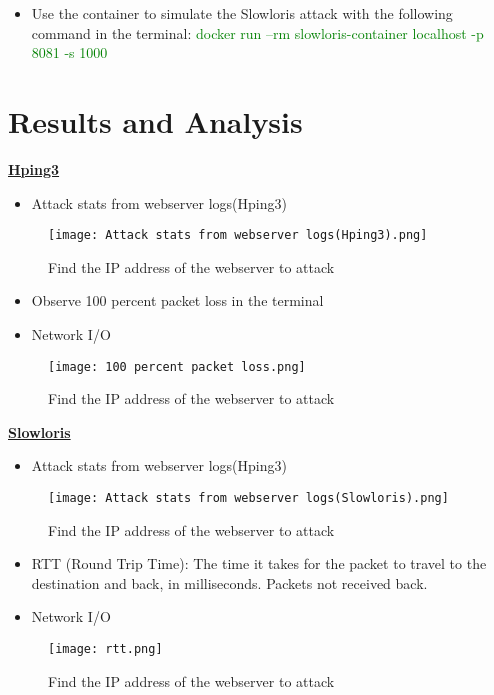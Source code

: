 \documentclass[conference]{IEEEtran}
\begin{document}
\begin{itemize}
\item Use the container to simulate the Slowloris attack with the following command in the terminal: \textcolor{green}{    docker run --rm slowloris-container localhost -p 8081 -s    1000
}
\end{itemize}


\section{Results and Analysis}
\underline{\textbf{Hping3}}
\begin{itemize}
\item Attack stats from webserver logs(Hping3)
\end{itemize}
\begin{figure}[htbp]
\hspace{0.7cm} 
\centerline{\texttt{[image: Attack stats from webserver logs(Hping3).png]}}
\caption{Find the IP address of the webserver to attack}
\label{fig}
\end{figure}
\begin{itemize}
\item Observe 100 percent packet loss in the terminal
\item Network I/O
\end{itemize}
\begin{figure}[htbp]
\hspace{0.7cm} 
\centerline{\texttt{[image: 100 percent packet loss.png]}}
\caption{Find the IP address of the webserver to attack}
\label{fig}
\end{figure}

\underline{\textbf{Slowloris}}
\begin{itemize}
\item Attack stats from webserver logs(Hping3)
\end{itemize}
\begin{figure}[htbp]
\hspace{0.7cm} 
\centerline{\texttt{[image: Attack stats from webserver logs(Slowloris).png]}}
\caption{Find the IP address of the webserver to attack}
\label{fig}
\end{figure}
\begin{itemize}
\item RTT (Round Trip Time): The time it takes for the packet to travel to the destination and back, in milliseconds. Packets not received back.
\item Network I/O
\end{itemize}
\begin{figure}[htbp]
\hspace{0.6cm} 
\centerline{\texttt{[image: rtt.png]}}
\caption{Find the IP address of the webserver to attack}
\label{fig}
\end{figure}
\end{document}
